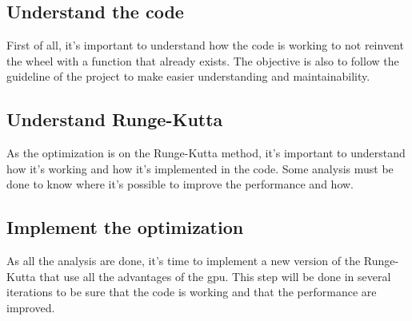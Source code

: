 \subsection{Understand the code}
\label{spec:ch:activities:improve-the-performance:understand-the-code}
First of all, it's important to understand how the code is working to not reinvent the wheel with a function that already exists.
The objective is also to follow the guideline of the project to make easier understanding and maintainability.


\subsection{Understand Runge-Kutta}
\label{spec:ch:activities:improve-the-performance:understand-runge-kutta}
As the optimization is on the Runge-Kutta method, it's important to understand how it's working and how it's implemented in the code.
Some analysis must be done to know where it's possible to improve the performance and how.


\subsection{Implement the optimization}
\label{spec:ch:activities:improve-the-performance:implement-the-optimization}
As all the analysis are done, it's time to implement a new version of the Runge-Kutta that use all the advantages of the \acrshort{gpu}.
This step will be done in several iterations to be sure that the code is working and that the performance are improved.


